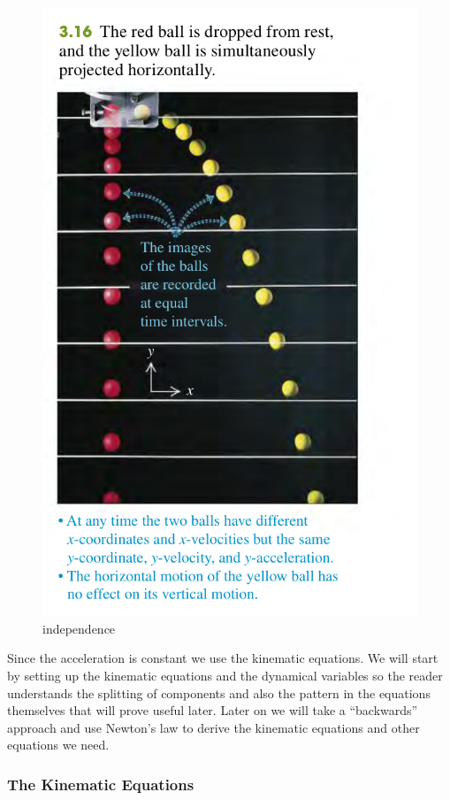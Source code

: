 \documentclass[11pt]{article}
\begin{document}
\begin{figure}
\centering
\includegraphics{images/independence.png}
\caption{independence}
\end{figure}

Since the acceleration is constant we use the kinematic equations. We
will start by setting up the kinematic equations and the dynamical
variables so the reader understands the splitting of components and also
the pattern in the equations themselves that will prove useful later.
Later on we will take a ``backwards'' approach and use Newton's law to
derive the kinematic equations and other equations we need.

\hypertarget{the-kinematic-equations}{%
\subsubsection{\texorpdfstring{\textbf{The Kinematic
Equations}}{The Kinematic Equations}}\label{the-kinematic-equations}}
\end{document}
